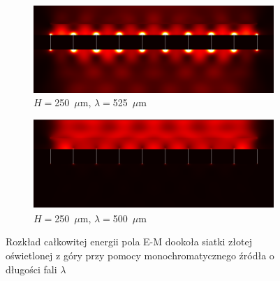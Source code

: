 \begin{figure}[bth]
	\begin{subfigure}{0.45\textwidth}
		\includegraphics[width=\textwidth]{images/thz/con_src_l525.png}
		\caption{$H=$250~$\mu$m, $\lambda=$525~$\mu$m}
		\label{fig:consrcl525}
	\end{subfigure}
	\begin{subfigure}{0.45\textwidth}
		\includegraphics[width=\textwidth]{images/thz/con_src_l500.png}
		\caption{$H=$250~$\mu$m, $\lambda=$500~$\mu$m}
		\label{fig:consrcl500}
	\end{subfigure}
	\caption{Rozkład całkowitej energii pola E-M dookoła siatki złotej oświetlonej z góry przy pomocy monochromatycznego źródła o długości fali $\lambda$}
\end{figure}

